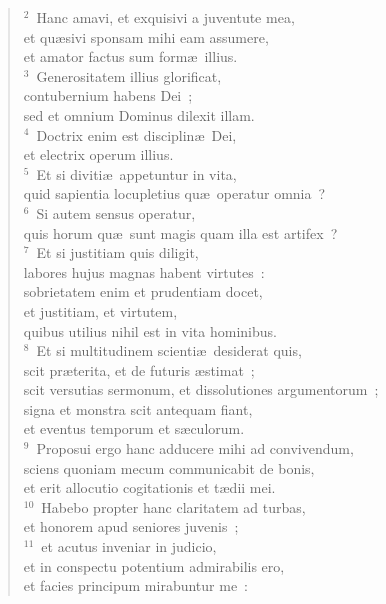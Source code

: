 \begin{verse}\vspace{6pt}${}^{2}$~Hanc amavi, et exquisivi a juventute mea,\\ et qu\ae sivi sponsam mihi eam assumere,\\ et amator factus sum form\ae\ illius.\\
${}^{3}$~Generositatem illius glorificat,\\ contubernium habens Dei~;\\ sed et omnium Dominus dilexit illam.\\
${}^{4}$~Doctrix enim est disciplin\ae\ Dei,\\ et electrix operum illius.\\
${}^{5}$~Et si diviti\ae\ appetuntur in vita,\\ quid sapientia locupletius qu\ae\ operatur omnia~?\\
${}^{6}$~Si autem sensus operatur,\\ quis horum qu\ae\ sunt magis quam illa est artifex~?\\
${}^{7}$~Et si justitiam quis diligit,\\ labores hujus magnas habent virtutes~:\\ sobrietatem enim et prudentiam docet,\\ et justitiam, et virtutem,\\ quibus utilius nihil est in vita hominibus.\\
${}^{8}$~Et si multitudinem scienti\ae\ desiderat quis,\\ scit pr\ae terita, et de futuris \ae stimat~;\\ scit versutias sermonum, et dissolutiones argumentorum~;\\ signa et monstra scit antequam fiant,\\ et eventus temporum et s\ae culorum.\\
${}^{9}$~Proposui ergo hanc adducere mihi ad convivendum,\\ sciens quoniam mecum communicabit de bonis,\\ et erit allocutio cogitationis et t\ae dii mei.\\
${}^{10}$~Habebo propter hanc claritatem ad turbas,\\ et honorem apud seniores juvenis~;\\
${}^{11}$~et acutus inveniar in judicio,\\ et in conspectu potentium admirabilis ero,\\ et facies principum mirabuntur me~:\\

\end{verse}
